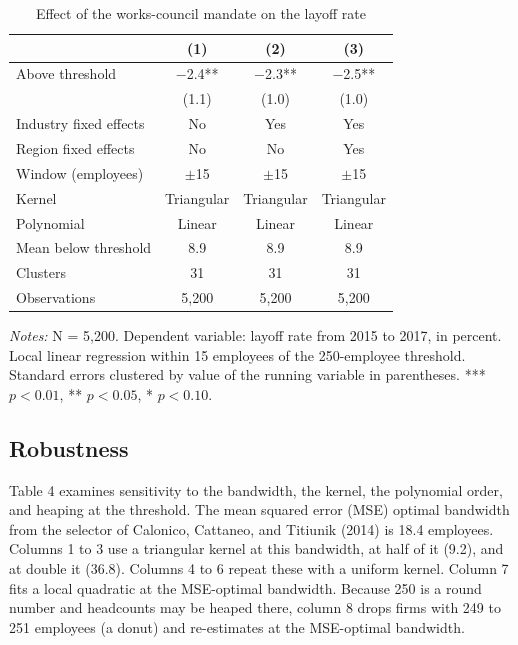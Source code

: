 \documentclass[12pt]{article}
\begin{document}
\begin{table}[htbp]
\centering
\begin{threeparttable}
\caption{Effect of the works-council mandate on the layoff rate}
\begin{tabular}{lccc}
\toprule
 & (1) & (2) & (3) \\
\midrule
Above threshold & $-$2.4** & $-$2.3** & $-$2.5** \\
 & (1.1) & (1.0) & (1.0) \\
\midrule
Industry fixed effects & No & Yes & Yes \\
Region fixed effects & No & No & Yes \\
Window (employees) & $\pm$15 & $\pm$15 & $\pm$15 \\
Kernel & Triangular & Triangular & Triangular \\
Polynomial & Linear & Linear & Linear \\
Mean below threshold & 8.9 & 8.9 & 8.9 \\
Clusters & 31 & 31 & 31 \\
Observations & 5,200 & 5,200 & 5,200 \\
\bottomrule
\end{tabular}
\begin{tablenotes}\footnotesize
\item \emph{Notes:} N = 5,200. Dependent variable: layoff rate from 2015 to 2017, in percent. Local linear regression within 15 employees of the 250-employee threshold. Standard errors clustered by value of the running variable in parentheses. *** $p<0.01$, ** $p<0.05$, * $p<0.10$.
\end{tablenotes}
\end{threeparttable}
\end{table}

\subsection{Robustness}

Table 4 examines sensitivity to the bandwidth, the kernel, the polynomial order, and heaping at the threshold. The mean squared error (MSE) optimal bandwidth from the selector of Calonico, Cattaneo, and Titiunik (2014) is 18.4 employees. Columns 1 to 3 use a triangular kernel at this bandwidth, at half of it (9.2), and at double it (36.8). Columns 4 to 6 repeat these with a uniform kernel. Column 7 fits a local quadratic at the MSE-optimal bandwidth. Because 250 is a round number and headcounts may be heaped there, column 8 drops firms with 249 to 251 employees (a donut) and re-estimates at the MSE-optimal bandwidth.
\end{document}
